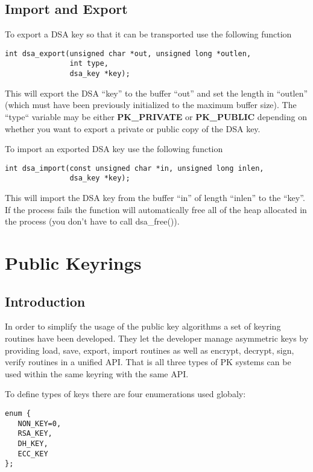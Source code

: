 \documentclass[b5paper]{book}
\begin{document}
\section{Import and Export}

To export a DSA key so that it can be transported use the following function
\begin{verbatim}
int dsa_export(unsigned char *out, unsigned long *outlen, 
               int type, 
               dsa_key *key);
\end{verbatim}
This will export the DSA ``key'' to the buffer ``out'' and set the length in ``outlen'' (which must have been previously
initialized to the maximum buffer size).  The ``type`` variable may be either \textbf{PK\_PRIVATE} or \textbf{PK\_PUBLIC}
depending on whether you want to export a private or public copy of the DSA key.

To import an exported DSA key use the following function

\begin{verbatim}
int dsa_import(const unsigned char *in, unsigned long inlen, 
               dsa_key *key);
\end{verbatim}

This will import the DSA key from the buffer ``in'' of length ``inlen'' to the ``key''.  If the process fails the function
will automatically free all of the heap allocated in the process (you don't have to call dsa\_free()).  

\chapter{Public Keyrings}
\section{Introduction}
In order to simplify the usage of the public key algorithms a set of keyring routines have been developed.  They let the 
developer manage asymmetric keys by providing load, save, export, import routines as well as encrypt, decrypt, sign, verify
routines in a unified API.  That is all three types of PK systems can be used within the same keyring with the same API.

To define types of keys there are four enumerations used globaly:
\begin{verbatim}
enum {
   NON_KEY=0,
   RSA_KEY,
   DH_KEY,
   ECC_KEY
};
\end{verbatim}
\end{document}
